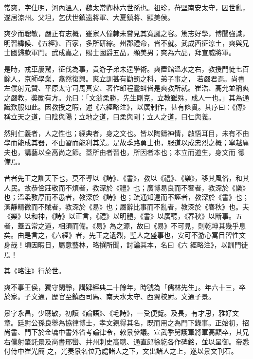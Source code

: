 \begin{pinyinscope}
 常爽，字仕明，河內溫人，魏太常卿林六世孫也。祖珍，苻堅南安太守，因世亂，遂居涼州。父坦，乞伏世鎮遠將軍、大夏鎮將、顯美侯。



 爽少而聰敏，嚴正有志概，雖家人僮隸未嘗見其寬誕之容。篤志好學，博聞強識，明習緯候、《五經》、百家，多所研綜。州郡禮命，皆不就。武成西征涼土，爽與兄士國歸款軍門。武成嘉之，賜士國爵五品，顯美男；爽為六品，拜宣威將軍。



 是時，戎車屢駕，征伐為事，貴游子弟未遑學術。爽置館溫水之右，教授門徒七百餘人，京師學業，翕然復興。爽立訓甚有勸罰之科，弟子事之，
 若嚴君焉。尚書左僕射元贊、平原太守司馬真安、著作郎程靈虯皆是爽教所就。崔浩、高允並稱爽之嚴教，獎勵有方。允曰：「文翁柔勝，先生剛克，立教雖殊，成人一也。」其為通識歎服如此。因教授之暇，述《六經略注》，以廣制作，甚有條貫。其序曰：《傳》稱立天之道，曰陰與陽；立地之道，曰柔與剛；立人之道，曰仁與義。



 然則仁義者，人之性也；經典者，身之文也。皆以陶鑄神情，啟悟耳目，未有不由學而能成其器，不由習而能利其業。是故季路勇士也，服道以成忠烈之概；寧越庸夫也，講藝以全高尚之節。蓋所由者習也，所因者本也；本立而道生，身文而
 德備焉。



 昔者先王之訓天下也，莫不導以《詩》、《書》，教以《禮》、《樂》，移其風俗，和其人民。故恭儉莊敬而不煩者，教深於《禮》也；廣博易良而不奢者，教深於《樂》也；溫柔敦厚而不愚者，教深於《詩》也；疏通知遠而不誣者，教深於《書》也；潔靜精微而不賊者，教深於《易》也；屬辭比事而不亂者，教深於《春秋》也。夫《樂》以和神，《詩》以正言，《禮》以明體，《書》以廣聽，《春秋》以斷事。五者，蓋五常之道，相須而備。《易》為之源，故曰《易》不可見，則乾坤其幾乎息矣。由是言之，《六經》者，先王之遺烈，聖人之盛事也，安可不游心寓目習性文身哉！頃因暇日，屬意藝林，略撰所聞，討論其本，名曰《六
 經略注》，以訓門徒焉！



 其《略注》行於世。



 爽不事王侯，獨守閑靜，講肄經典二十餘年，時號為「儒林先生」。年六十三，卒於家。子文通，歷官至鎮西司馬、南天水太守、西翼校尉。文通子景。



 景字永昌，少聰敏，初讀《論語》、《毛詩》，一受便覽。及長，有才思，雅好文章。廷尉公孫良舉為協律博士，孝文親得其名，既而用之為門下錄事。正始初，招尚書、門下於金墉中書外省考論律令，敕景參議。宣武季舅護軍將軍高顯卒，其兄右僕射肇託景及尚書邢巒、并州刺史高聰、通直郎徐紇各作碑銘，並以呈御。帝悉付侍中崔光簡
 之，光奏景名位乃處諸人之下，文出諸人之上，遂以景文刊石。




\end{pinyinscope}
